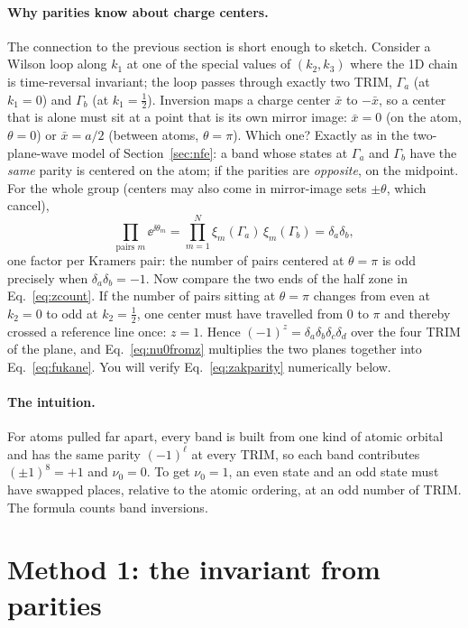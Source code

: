 \paragraph{Why parities know about charge centers.} The connection to the
previous section is short enough to sketch. Consider a Wilson loop along
$k_1$ at one of the special values of $(k_2,k_3)$ where the 1D chain is
time-reversal invariant; the loop passes through exactly two TRIM,
$\Gamma_a$ (at $k_1 = 0$) and $\Gamma_b$ (at $k_1=\tfrac12$). Inversion
maps a charge center $\bar x$ to $-\bar x$, so a center that is alone must
sit at a point that is its own mirror image: $\bar x = 0$ (on the atom,
$\theta = 0$) or $\bar x = a/2$ (between atoms, $\theta = \pi$). Which one?
Exactly as in the two-plane-wave model of Section~\ref{sec:nfe}: a band
whose states at $\Gamma_a$ and $\Gamma_b$ have the \emph{same} parity is
centered on the atom; if the parities are \emph{opposite}, on the midpoint.
For the whole group (centers may also come in mirror-image sets
$\pm\theta$, which cancel),
\begin{equation}
\prod_{\text{pairs } m} \ee^{\ii\theta_m}
= \prod_{m=1}^{N} \xi_m(\Gamma_a)\,\xi_m(\Gamma_b) = \delta_a\delta_b ,
\label{eq:zakparity}
\end{equation}
one factor per Kramers pair: the number of pairs centered at
$\theta = \pi$ is odd precisely when $\delta_a\delta_b = -1$. Now compare
the two ends of the half zone in Eq.~\eqref{eq:zcount}. If the number of
pairs sitting at $\theta=\pi$ changes from even at $k_2 = 0$ to odd at
$k_2=\tfrac12$, one center must have travelled from $0$ to $\pi$ and
thereby crossed a reference line once: $z = 1$. Hence
$(-1)^{z} = \delta_a\delta_b\delta_c\delta_d$ over the four TRIM of the
plane, and Eq.~\eqref{eq:nu0fromz} multiplies the two planes together into
Eq.~\eqref{eq:fukane}. You will verify Eq.~\eqref{eq:zakparity}
numerically below.

\paragraph{The intuition.} For atoms pulled far apart, every band is built
from one kind of atomic orbital and has the same parity $(-1)^\ell$ at
every TRIM, so each band contributes $(\pm1)^8 = +1$ and $\nu_0 = 0$. To
get $\nu_0 = 1$, an even state and an odd state must have swapped places,
relative to the atomic ordering, at an odd number of TRIM. The formula
counts band inversions.

\section{Method 1: the invariant from parities}
\label{sec:goldparity}

